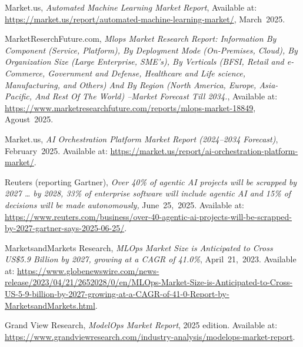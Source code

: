 \documentclass[11pt, a4paper, oneside]{article}
\begin{document}

\newpage
\begin{thebibliography}{99}
    Market.us, \textit{Automated Machine Learning Market Report}, Available at: \url{https://market.us/report/automated-machine-learning-market/}, March~2025.
    
    MarketReserchFuture.com, \textit{Mlops Market Research Report: Information By Component (Service, Platform), By Deployment Mode (On-Premises, Cloud), By Organization Size (Large Enterprise, SME's), By Verticals (BFSI, Retail and e-Commerce, Government and Defense, Healthcare and Life science, Manufacturing, and Others) And By Region (North America, Europe, Asia-Pacific, And Rest Of The World) –Market Forecast Till 2034.}, Available at: \url{https://www.marketresearchfuture.com/reports/mlops-market-18849}, Agoust~2025.
    
    Market.us, \textit{AI Orchestration Platform Market Report (2024--2034 Forecast)}, February~2025.  
    Available at: \url{https://market.us/report/ai-orchestration-platform-market/}.

    Reuters (reporting Gartner), \textit{Over 40\% of agentic AI projects will be scrapped by 2027 … by 2028, 33\% of enterprise software will include agentic AI and 15\% of decisions will be made autonomously,} June~25,~2025.  
    Available at: \url{https://www.reuters.com/business/over-40-agentic-ai-projects-will-be-scrapped-by-2027-gartner-says-2025-06-25/}.

    MarketsandMarkets Research, \textit{MLOps Market Size is Anticipated to Cross US\$5.9 Billion by 2027, growing at a CAGR of 41.0\%}, April~21,~2023.  
    Available at: \url{https://www.globenewswire.com/news-release/2023/04/21/2652028/0/en/MLOps-Market-Size-is-Anticipated-to-Cross-US-5-9-billion-by-2027-growing-at-a-CAGR-of-41-0-Report-by-MarketsandMarkets.html}.

    Grand View Research, \textit{ModelOps Market Report}, 2025 edition.  
    Available at: \url{https://www.grandviewresearch.com/industry-analysis/modelops-market-report}.


\end{thebibliography}
\end{document}
